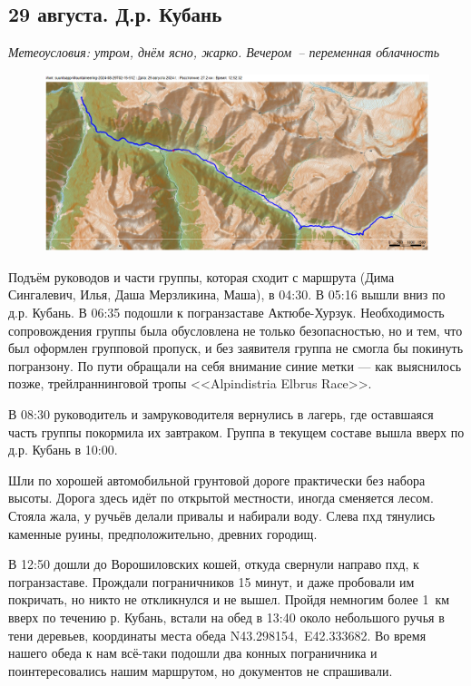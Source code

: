 \subsection{29 августа. Д.р. Кубань}
\textit{Метеоусловия: утром, днём ясно, жарко. Вечером~-- переменная облачность}

\begin{figure}[h!]
	\centering
	\includegraphics[angle=0, width=0.7\linewidth]{../pics/mini_maps/29}
	\label{fig:mini_29}
\end{figure}


Подъём руководов и части группы, которая сходит с маршрута (Дима Сингалевич, Илья, Даша Мерзликина, Маша), в 04:30. В 05:16 вышли вниз по д.р. Кубань. В 06:35 подошли к погранзаставе Актюбе-Хурзук. Необходимость сопровождения группы была обусловлена не только безопасностью, но и тем, что был оформлен групповой пропуск, и без заявителя группа не смогла бы покинуть погранзону. По пути обращали на себя внимание синие метки --- как выяснилось позже, трейлраннинговой тропы <<Alpindistria Elbrus Race>>.

В 08:30 руководитель и замруководителя вернулись в лагерь, где оставшаяся часть группы покормила их завтраком. Группа в текущем составе вышла вверх по д.р. Кубань в 10:00.


Шли по хорошей автомобильной грунтовой дороге практически без набора высоты. Дорога здесь идёт по открытой местности, иногда сменяется лесом. Стояла жала, у ручьёв делали привалы и набирали воду. Слева пхд тянулись каменные руины, предположительно, древних городищ.


В 12:50 дошли до Ворошиловских кошей, откуда свернули направо пхд, к погранзаставе. Прождали пограничников 15 минут, и даже пробовали им покричать, но никто не откликнулся и не вышел. Пройдя немногим более 1~км вверх по течению р. Кубань, встали на обед в 13:40 около небольшого ручья в тени деревьев, координаты места обеда N43.298154\degree,~E42.333682\degree. Во время нашего обеда к нам всё-таки подошли два конных пограничника и поинтересовались нашим маршрутом, но документов не спрашивали.

